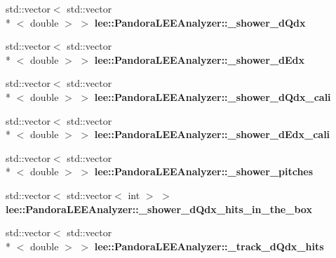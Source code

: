 \begin{DoxyCompactItemize}
\item 
\hypertarget{group__lee_gaec600c2d05138143cbef4f23c44d92cf}{std\-::vector$<$ std\-::vector\\*
$<$ double $>$ $>$ {\bfseries lee\-::\-Pandora\-L\-E\-E\-Analyzer\-::\-\_\-shower\-\_\-d\-Qdx}}\label{group__lee_gaec600c2d05138143cbef4f23c44d92cf}

\item 
\hypertarget{group__lee_gab709b5ce1a5b80131bd14a57c2e82bf5}{std\-::vector$<$ std\-::vector\\*
$<$ double $>$ $>$ {\bfseries lee\-::\-Pandora\-L\-E\-E\-Analyzer\-::\-\_\-shower\-\_\-d\-Edx}}\label{group__lee_gab709b5ce1a5b80131bd14a57c2e82bf5}

\item 
\hypertarget{group__lee_gaaf81a95a1829c0041e9770be3d09f240}{std\-::vector$<$ std\-::vector\\*
$<$ double $>$ $>$ {\bfseries lee\-::\-Pandora\-L\-E\-E\-Analyzer\-::\-\_\-shower\-\_\-d\-Qdx\-\_\-cali}}\label{group__lee_gaaf81a95a1829c0041e9770be3d09f240}

\item 
\hypertarget{group__lee_gac413e11bfcca3b51ee4ab36ad94e68ba}{std\-::vector$<$ std\-::vector\\*
$<$ double $>$ $>$ {\bfseries lee\-::\-Pandora\-L\-E\-E\-Analyzer\-::\-\_\-shower\-\_\-d\-Edx\-\_\-cali}}\label{group__lee_gac413e11bfcca3b51ee4ab36ad94e68ba}

\item 
\hypertarget{group__lee_gaf56713e8dd07060973767857b7f8508f}{std\-::vector$<$ std\-::vector\\*
$<$ double $>$ $>$ {\bfseries lee\-::\-Pandora\-L\-E\-E\-Analyzer\-::\-\_\-shower\-\_\-pitches}}\label{group__lee_gaf56713e8dd07060973767857b7f8508f}

\item 
\hypertarget{group__lee_ga99371e105e8aa387ee0f0b548f788b57}{std\-::vector$<$ std\-::vector$<$ int $>$ $>$ {\bfseries lee\-::\-Pandora\-L\-E\-E\-Analyzer\-::\-\_\-shower\-\_\-d\-Qdx\-\_\-hits\-\_\-in\-\_\-the\-\_\-box}}\label{group__lee_ga99371e105e8aa387ee0f0b548f788b57}

\item 
\hypertarget{group__lee_ga4aa643d1912fe002773cb2bd1268f0f8}{std\-::vector$<$ std\-::vector\\*
$<$ double $>$ $>$ {\bfseries lee\-::\-Pandora\-L\-E\-E\-Analyzer\-::\-\_\-track\-\_\-d\-Qdx\-\_\-hits}}\label{group__lee_ga4aa643d1912fe002773cb2bd1268f0f8}


\end{DoxyCompactItemize}
